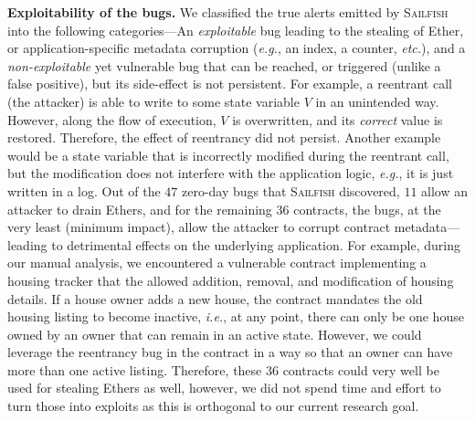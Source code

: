 \documentclass[conference, romanappendices]{tex/IEEEtran}
\theoremstyle{bfnote}
\newcommand{\toolname}{\textsc{Sailfish}\xspace}
\newcommand{\ether}{{Ether}\xspace}
\newcommand{\reentrancy}{{reentrancy}\xspace}
\newcommand{\etc}{\textit{etc.}}
\newcommand{\eg}{\textit{e.g.}}
\newcommand{\ie}{\textit{i.e.}}
\newcommand{\zeroDays}{47}
\begin{document}
\noindent
\textbf{Exploitability of the bugs.}
We classified the true alerts emitted by \toolname{} into the following categories---An \textit{exploitable} bug leading to the stealing of \ether, or application-specific metadata corruption (\eg, an index, a counter, \etc), and a \textit{non-exploitable} yet vulnerable bug that can be reached, or triggered (unlike a false positive), but its side-effect is not persistent.
For example, a reentrant call (the attacker) is able to write to some state variable $V$ in an unintended way.
However, along the flow of execution, $V$ is overwritten, and its \textit{correct} value is restored.
Therefore, the effect of \reentrancy did not persist.
Another example would be a state variable that is incorrectly modified during the reentrant call, but the modification does not interfere with the application logic, \eg, it is just written in a log.
Out of the $\zeroDays$ zero-day bugs that \toolname discovered, $11$ allow an attacker to {drain\EndAccSupp{}} {Ethers\EndAccSupp{}}, and for the remaining $36$ contracts, the bugs, at the very least (minimum impact), allow the attacker to corrupt contract metadata---leading to detrimental effects on the underlying application.
For example, during our manual analysis, we encountered a vulnerable contract implementing a {housing\EndAccSupp{}} {tracker\EndAccSupp{}} that the allowed addition, removal, and modification of housing details.
If a house owner adds a new house, the contract mandates the old housing listing to become {inactive\EndAccSupp{}}, \ie, at any point, there can only be one house owned by an owner that can remain in an active state.
However, we could leverage the \reentrancy bug in the contract in a way so that an owner can have more than one active listing.
Therefore, these $36$ contracts could very well be used for stealing {Ethers\EndAccSupp{}} as well, however, we did not spend time and effort to turn those into exploits as this is orthogonal to our current research goal.
\end{document}
